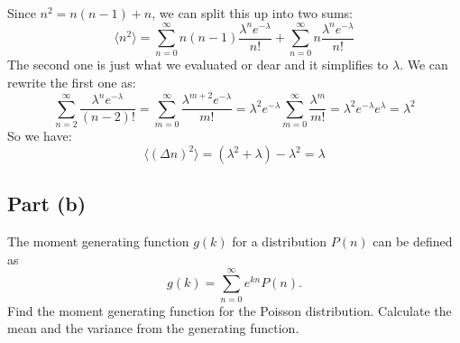 \documentclass{article}
\begin{document}
Since $n^2 = n(n-1) + n$, we can split this up into two sums:
\begin{equation}
    \langle n^2 \rangle = \sum_{n=0}^{\infty} n(n-1) \frac{\lambda^n e^{-\lambda}}{n!} + \sum_{n=0}^{\infty} n \frac{\lambda^n e^{-\lambda}}{n!}
\end{equation}
The second one is just what we evaluated or dear and it simplifies to \( \lambda \). We can rewrite the first one as:
\begin{equation}
    \sum_{n=2}^{\infty} \frac{\lambda^n e^{-\lambda}}{(n-2)!} = \sum_{m=0}^{\infty} \frac{\lambda^{m+2} e^{-\lambda}}{m!} = \lambda^2 e^{-\lambda} \sum_{m=0}^{\infty} \frac{\lambda^m}{m!} = \lambda^2 e^{-\lambda} e^{\lambda} = \lambda^2
\end{equation}
So we have:
\begin{equation}
    \langle (\Delta n)^2 \rangle = (\lambda^2 + \lambda) - \lambda^2 = \boxed{\lambda}
\end{equation}


\subsection{Part (b)}
The moment generating function \( g(k) \) for a distribution \( P(n) \) can be defined as
\[
g(k) = \sum_{n=0}^{\infty} e^{kn} P(n).
\]
Find the moment generating function for the Poisson distribution. Calculate the mean and the variance from the generating function.
\end{document}
